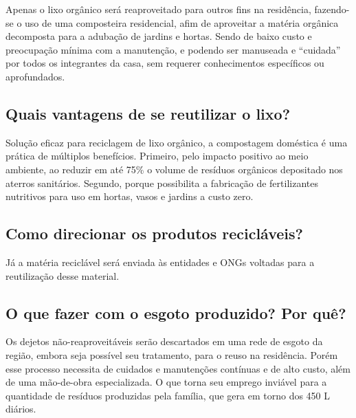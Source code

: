	Apenas o lixo orgânico será reaproveitado para outros fins na residência, fazendo-se o uso de uma composteira residencial, afim de aproveitar a matéria orgânica decomposta para a adubação de jardins e hortas. Sendo de baixo custo e preocupação mínima com a manutenção, e podendo ser manuseada e “cuidada” por todos os integrantes da casa, sem requerer conhecimentos específicos ou aprofundados.

\subsection{Quais vantagens de se reutilizar o lixo?}

	Solução eficaz para reciclagem de lixo orgânico, a compostagem doméstica é uma prática de múltiplos benefícios. Primeiro, pelo impacto positivo ao meio ambiente, ao reduzir em até 75\% o volume de resíduos orgânicos depositado nos aterros sanitários. Segundo, porque possibilita a fabricação de fertilizantes nutritivos para uso em hortas, vasos e jardins a custo zero.

\subsection{Como direcionar os produtos recicláveis?}

	Já a matéria reciclável será enviada às entidades e ONGs voltadas para a reutilização desse material.

\subsection{O que fazer com o esgoto produzido? Por quê?}

	Os dejetos não-reaproveitáveis serão descartados em uma rede de esgoto da região, embora seja possível seu tratamento, para o reuso na residência. Porém esse processo necessita de cuidados e manutenções contínuas e de alto custo, além de uma mão-de-obra especializada. O que torna seu emprego inviável para a quantidade de resíduos produzidas pela família, que gera em torno dos 450 L diários.\cite{estimativaNBR7229}\cite{ecycle}
